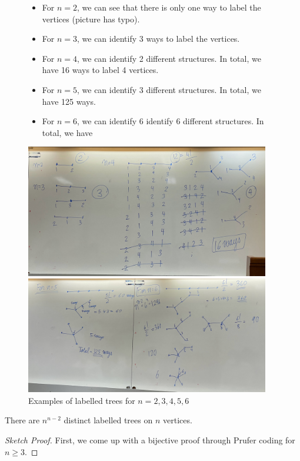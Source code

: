 \begin{figure}[ht]
\begin{nexample}
  \phantom{omo}

  \begin{itemize}
    \item For \(n=2\), we can see that there is only one way to label the vertices
      (picture has typo). 
    \item For \(n=3\), we can identify 3 ways to label the vertices.
    \item For \(n=4\), we can identify 2 different structures. In total, we have 16
      ways to label 4 vertices.
    \item For \(n=5\), we can identify 3 different structures. In total, we have 125
      ways.
    \item For \(n=6\), we can identify 6 identify 6 different structures. In total, we
      have 
  \end{itemize}

  \begin{center}
    \includegraphics[width=0.95\textwidth]{figures/l05/label1}

    \includegraphics[width=0.95\textwidth]{figures/l05/label2}
  \end{center}
  \caption{Examples of labelled trees for \(n=2,3,4,5,6\)}\label{fig:label-examples}
\end{nexample}
\end{figure}

\begin{theorem}
  There are \(n^{n-2}\) distinct labelled trees on \(n\) vertices.
\end{theorem}

\begin{proof}[Sketch Proof]
  First, we come up with a bijective proof through Prufer coding for \(n \geq
  3\). 
\end{proof}

